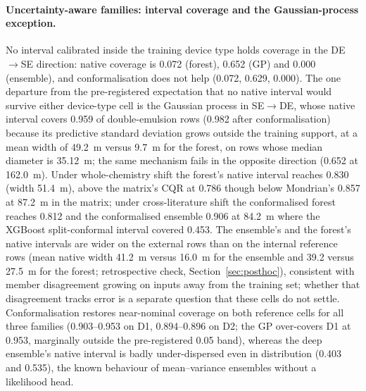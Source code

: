 \documentclass[11pt,a4paper]{article}
\newcommand{\um}{\textmu m}
\begin{document}
\paragraph{Uncertainty-aware families: interval coverage and the
Gaussian-process exception.} No interval calibrated inside the training
device type holds coverage in the DE$\to$SE direction: native coverage is
0.072 (forest), 0.652 (GP) and 0.000 (ensemble), and conformalisation
does not help (0.072, 0.629, 0.000). The one departure from the
pre-registered expectation that no native interval would survive either
device-type cell is the Gaussian process in SE$\to$DE, whose native interval
covers 0.959 of double-emulsion rows (0.982 after conformalisation) because
its predictive standard deviation grows outside the training support, at a
mean width of 49.2~\um{} versus 9.7~\um{} for the forest, on rows whose
median diameter is 35.12~\um; the same mechanism fails in the opposite
direction (0.652 at 162.0~\um). Under whole-chemistry shift the forest's
native interval reaches 0.830 (width 51.4~\um), above the matrix's CQR at
0.786 though below Mondrian's 0.857 at 87.2~\um{} in the matrix; under
cross-literature shift the conformalised forest reaches 0.812 and the
conformalised ensemble 0.906 at 84.2~\um{} where the XGBoost split-conformal
interval covered 0.453. The ensemble's and the forest's native intervals are
wider on the external rows than on the internal reference rows (mean native
width 41.2~\um{} versus 16.0~\um{} for the ensemble and 39.2 versus
27.5~\um{} for the forest; retrospective check, Section~\ref{sec:posthoc}),
consistent with member disagreement growing on inputs away from the training
set; whether that disagreement tracks error is a separate question that
these cells do not settle. Conformalisation restores near-nominal coverage on
both reference cells for all three families (0.903--0.953 on D1,
0.894--0.896 on D2; the GP over-covers D1 at 0.953, marginally outside
the pre-registered 0.05 band), whereas the deep ensemble's native interval is
badly under-dispersed even in distribution (0.403 and 0.535), the known
behaviour of mean--variance ensembles without a likelihood head.
\end{document}
